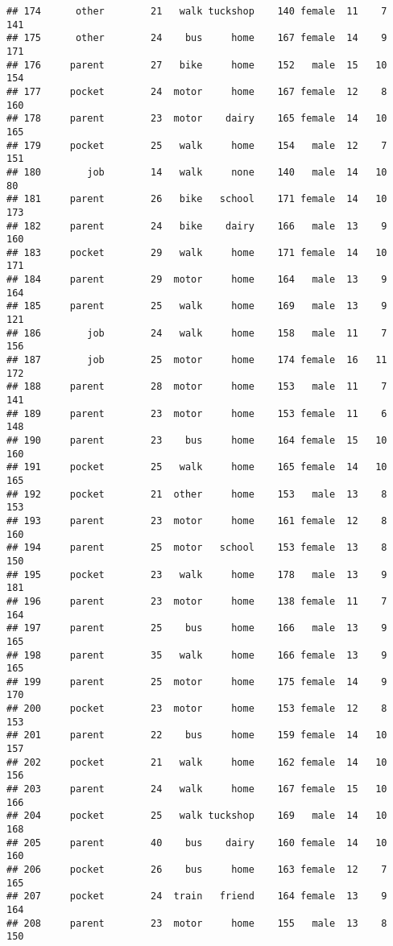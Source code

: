 \documentclass[
]{article}
\begin{document}
\begin{verbatim}
## 174      other        21   walk tuckshop    140 female  11    7     141
## 175      other        24    bus     home    167 female  14    9     171
## 176     parent        27   bike     home    152   male  15   10     154
## 177     pocket        24  motor     home    167 female  12    8     160
## 178     parent        23  motor    dairy    165 female  14   10     165
## 179     pocket        25   walk     home    154   male  12    7     151
## 180        job        14   walk     none    140   male  14   10      80
## 181     parent        26   bike   school    171 female  14   10     173
## 182     parent        24   bike    dairy    166   male  13    9     160
## 183     pocket        29   walk     home    171 female  14   10     171
## 184     parent        29  motor     home    164   male  13    9     164
## 185     parent        25   walk     home    169   male  13    9     121
## 186        job        24   walk     home    158   male  11    7     156
## 187        job        25  motor     home    174 female  16   11     172
## 188     parent        28  motor     home    153   male  11    7     141
## 189     parent        23  motor     home    153 female  11    6     148
## 190     parent        23    bus     home    164 female  15   10     160
## 191     pocket        25   walk     home    165 female  14   10     165
## 192     pocket        21  other     home    153   male  13    8     153
## 193     parent        23  motor     home    161 female  12    8     160
## 194     parent        25  motor   school    153 female  13    8     150
## 195     pocket        23   walk     home    178   male  13    9     181
## 196     parent        23  motor     home    138 female  11    7     164
## 197     parent        25    bus     home    166   male  13    9     165
## 198     parent        35   walk     home    166 female  13    9     165
## 199     parent        25  motor     home    175 female  14    9     170
## 200     pocket        23  motor     home    153 female  12    8     153
## 201     parent        22    bus     home    159 female  14   10     157
## 202     pocket        21   walk     home    162 female  14   10     156
## 203     parent        24   walk     home    167 female  15   10     166
## 204     pocket        25   walk tuckshop    169   male  14   10     168
## 205     parent        40    bus    dairy    160 female  14   10     160
## 206     pocket        26    bus     home    163 female  12    7     165
## 207     pocket        24  train   friend    164 female  13    9     164
## 208     parent        23  motor     home    155   male  13    8     150

\end{verbatim}
\end{document}
